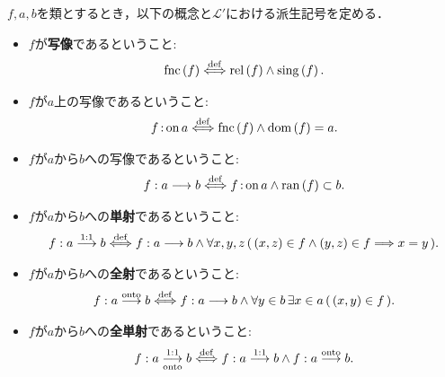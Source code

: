 	\begin{screen}
		\begin{dfn}[写像] $f,a,b$を類とするとき，以下の概念と$\mathcal{L}'$における派生記号を定める．
			\begin{itemize}
				\item $f$が{\bf 写像}であるということ:
					\begin{align}
						\operatorname*{fnc} \left(f\right) \overset{\mathrm{def}}{\Longleftrightarrow}
						\operatorname*{rel} \left(f\right) \wedge \operatorname*{sing} \left(f\right).
					\end{align}
				
				\item $f$が$a$上の写像であるということ:
					\begin{align}
						f \operatorname*{:on} a \overset{\mathrm{def}}{\Longleftrightarrow}
						\operatorname*{fnc} \left(f\right) \wedge \operatorname*{dom} \left(f\right) = a.
					\end{align}
					
				\item $f$が$a$から$b$への写像であるということ:
					\begin{align}
						f:a \longrightarrow b \overset{\mathrm{def}}{\Longleftrightarrow}
						f \operatorname*{:on} a \wedge \operatorname*{ran} \left(f\right) \subset b.
					\end{align}
				
				\item $f$が$a$から$b$への{\bf 単射}であるということ:
					\begin{align}
						f:a \overset{\mathrm{1:1}}{\longrightarrow} b \overset{\mathrm{def}}{\Longleftrightarrow}
						f:a \longrightarrow b \wedge \forall x,y,z\, (\, (x,z) \in f \wedge (y,z) \in f
						\Longrightarrow x=y\, ).
					\end{align}
					
				\item $f$が$a$から$b$への{\bf 全射}であるということ:
					\begin{align}
						f:a \overset{\mathrm{onto}}{\longrightarrow} b \overset{\mathrm{def}}{\Longleftrightarrow}
						f:a \longrightarrow b \wedge \forall y \in b\, \exists x \in a\, (\, (x,y) \in f\, ).
					\end{align}
					
				\item $f$が$a$から$b$への{\bf 全単射}であるということ:
					\begin{align}
						f:a \underset{\mathrm{onto}}{\overset{\mathrm{1:1}}{\longrightarrow}} b \overset{\mathrm{def}}{\Longleftrightarrow}
						f:a \overset{\mathrm{1:1}}{\longrightarrow} b \wedge f:a \overset{\mathrm{onto}}{\longrightarrow} b.
					\end{align}
			\end{itemize}
		\end{dfn}
	\end{screen}
	
